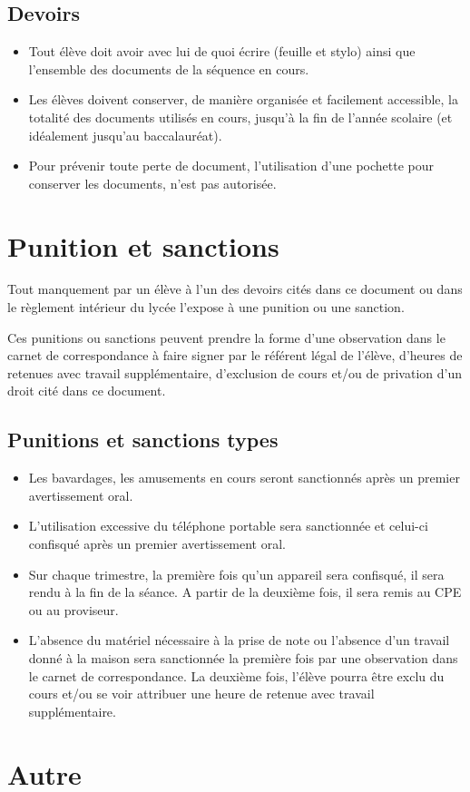 \documentclass[10pt,fleqn]{article} %
\begin{document}
\subsection{Devoirs}
\begin{itemize}
    \item Tout élève doit avoir avec lui de quoi écrire (feuille et stylo) ainsi que l'ensemble des documents de la séquence en cours. 
    \item Les élèves doivent conserver, de manière organisée et facilement accessible, la totalité des documents utilisés en cours, jusqu'à la fin de l'année scolaire (et idéalement jusqu'au baccalauréat). 
    \item Pour prévenir toute perte de document, l'utilisation d'une pochette pour conserver les documents, n'est pas autorisée. 
    
\end{itemize}

\section{Punition et sanctions}
Tout manquement par un élève à l'un des devoirs cités dans ce document ou dans le règlement intérieur du lycée l'expose à une punition ou une sanction. 

Ces punitions ou sanctions peuvent prendre la forme d'une observation dans le carnet de correspondance à faire signer par le référent légal de l'élève, d'heures de retenues avec travail supplémentaire, d'exclusion de cours et/ou de privation d'un droit cité dans ce document. 

\subsection{Punitions et sanctions types}
\begin{itemize}
    \item  Les bavardages, les amusements en cours seront sanctionnés après un premier avertissement oral. 
    \item L'utilisation excessive du téléphone portable sera sanctionnée et celui-ci confisqué après un premier avertissement oral. 
    \item Sur chaque trimestre, la première fois qu'un appareil sera confisqué, il sera rendu à la fin de la séance. A partir de la deuxième fois, il sera remis au CPE ou au proviseur. 
    \item L'absence du matériel nécessaire à la prise de note ou l'absence d'un travail donné à la maison sera sanctionnée la première fois par une observation dans le carnet de correspondance. La deuxième fois, l'élève pourra être exclu du cours et/ou se voir attribuer une heure de retenue avec travail supplémentaire. 
\end{itemize}

\section{Autre}
\end{document}
